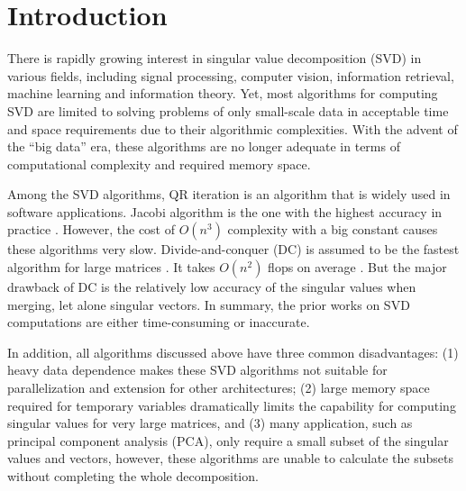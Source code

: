 \section{Introduction} \label{sec:intro}
There is rapidly growing interest in singular value decomposition (SVD) in various fields,
including signal processing, computer vision, information retrieval, machine learning and information theory.
Yet, most algorithms for computing SVD are limited to solving problems of only small-scale data in acceptable time and space requirements due to their algorithmic complexities.
With the advent of the ``big data'' era, these algorithms are no longer adequate in terms of computational complexity and required memory space.


Among the SVD algorithms, QR iteration is an algorithm that is widely used in software applications.
Jacobi algorithm is the one with the highest accuracy in practice \cite{97bookalgebra}.
However, the cost of $O(n^3)$ complexity with a big constant causes these algorithms very slow.
Divide-and-conquer (DC) is assumed to be the fastest algorithm for large matrices \cite{94DCSVD}.
It takes $O(n^{2})$ flops on average \cite{97bookalgebra}. 
But the major drawback of DC is the relatively low accuracy of the singular values when merging, let alone singular vectors. 
In summary, the prior works on SVD computations are either time-consuming or inaccurate.

In addition, all algorithms discussed above have three common disadvantages:
(1) heavy data dependence makes these SVD algorithms not suitable for parallelization and extension for other architectures;
(2) large memory space required for temporary variables dramatically limits the capability for computing singular values for very large matrices, and
(3) many application, such as principal component analysis (PCA), only require a small subset of the singular values and vectors, however, these algorithms are unable to calculate the subsets without completing the whole decomposition.

